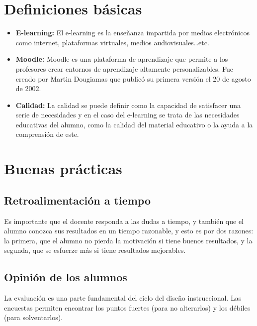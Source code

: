 

\section{Definiciones básicas}

\begin{itemize}
	\item \textbf{E-learning:}
	El e-learning es la enseñanza impartida por medios electrónicos como internet, plataformas virtuales, medios audiovisuales…etc.
	\item \textbf{Moodle:}
	Moodle es una plataforma de aprendizaje que permite a los profesores crear entornos de aprendizaje altamente personalizables. Fue creado por Martin Dougiamas que publicó su primera versión el 20 de agosto de 2002\cite{dougiamas2002interpretive}.
	\item \textbf{Calidad:}
	La calidad se puede definir como la capacidad de satisfacer una serie de necesidades y en el caso del e-learning se trata de las necesidades educativas del alumno, como la calidad del material educativo o la ayuda a la comprensión de este.
\end{itemize}

\section{Buenas prácticas}
\subsection{Retroalimentación a tiempo}
Es importante que el docente responda a las dudas a tiempo, y también que el alumno conozca sus resultados en un tiempo razonable, y esto es por dos razones: la primera, que el alumno no pierda la motivación si tiene buenos resultados, y la segunda, que se esfuerze más si tiene resultados mejorables.
\subsection{Opinión de los alumnos}
La evaluación es una parte fundamental del ciclo del diseño instruccional.
Las encuestas permiten encontrar los puntos fuertes (para no alterarlos) y los débiles (para solventarlos).

